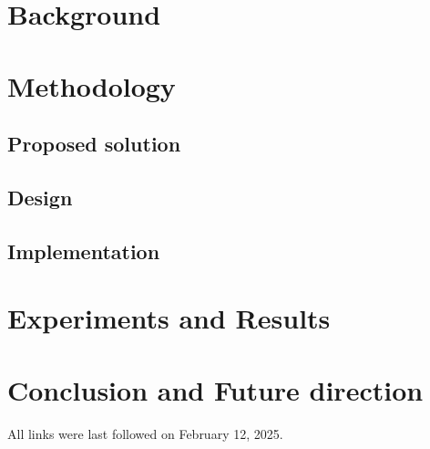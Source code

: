 \documentclass[
  a4paper,  %
  twoside,  %
  bibliography=totoc,
  headsepline,
  cleardoublepage=empty,
  parskip=half,
  draft=false
]{scrbook}
\begin{document}
\chapter{Background}
\label{chap:k3}

\let\cleardoublepage\clearpage
\chapter{Methodology}
\label{chap:k4}

\let\cleardoublepage\clearpage
\section{Proposed solution}
\label{chap:k5}

\let\cleardoublepage\clearpage
\section{Design}
\label{chap:k6}

\let\cleardoublepage\clearpage
\section{Implementation}
\label{chap:k7}

\let\cleardoublepage\clearpage
\chapter{Experiments and Results}
\label{chap:k8}

\let\cleardoublepage\clearpage
\chapter{Conclusion and Future direction}
\label{chap:k9}


\printbibliography

All links were last followed on February 12, 2025.
\clearpage 
\appendix
\end{document}
